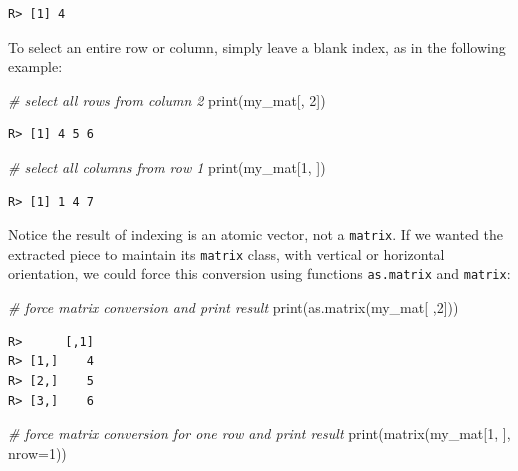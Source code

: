 \documentclass[
  12pt,
]{book}
\newenvironment{Shaded}{\begin{snugshade}}{\end{snugshade}}
\newcommand{\AttributeTok}[1]{\textcolor[rgb]{0.61,0.61,0.61}{#1}}
\newcommand{\CommentTok}[1]{\textcolor[rgb]{0.37,0.37,0.37}{\textit{#1}}}
\newcommand{\DecValTok}[1]{\textcolor[rgb]{0.06,0.06,0.06}{#1}}
\newcommand{\FunctionTok}[1]{\textcolor[rgb]{0,0,0}{#1}}
\newcommand{\NormalTok}[1]{#1}
\begin{document}
\begin{verbatim}
R> [1] 4
\end{verbatim}

To select an entire row or column, simply leave a blank index, as in the following example:

\begin{Shaded}
\begin{Highlighting}[]
\CommentTok{\# select all rows from column 2}
\FunctionTok{print}\NormalTok{(my\_mat[, }\DecValTok{2}\NormalTok{])}
\end{Highlighting}
\end{Shaded}

\begin{verbatim}
R> [1] 4 5 6
\end{verbatim}

\begin{Shaded}
\begin{Highlighting}[]
\CommentTok{\# select all columns from row 1}
\FunctionTok{print}\NormalTok{(my\_mat[}\DecValTok{1}\NormalTok{, ])}
\end{Highlighting}
\end{Shaded}

\begin{verbatim}
R> [1] 1 4 7
\end{verbatim}

Notice the result of indexing is an atomic vector, not a \texttt{matrix}. If we wanted the extracted piece to maintain its \texttt{matrix} class, with vertical or horizontal orientation, we could force this conversion using functions \texttt{as.matrix} and \texttt{matrix}:  

\begin{Shaded}
\begin{Highlighting}[]
\CommentTok{\# force matrix conversion and print result}
\FunctionTok{print}\NormalTok{(}\FunctionTok{as.matrix}\NormalTok{(my\_mat[ ,}\DecValTok{2}\NormalTok{]))}
\end{Highlighting}
\end{Shaded}

\begin{verbatim}
R>      [,1]
R> [1,]    4
R> [2,]    5
R> [3,]    6
\end{verbatim}

\begin{Shaded}
\begin{Highlighting}[]
\CommentTok{\# force matrix conversion for one row and print result}
\FunctionTok{print}\NormalTok{(}\FunctionTok{matrix}\NormalTok{(my\_mat[}\DecValTok{1}\NormalTok{, ], }\AttributeTok{nrow=}\DecValTok{1}\NormalTok{))}
\end{Highlighting}
\end{Shaded}
\end{document}
